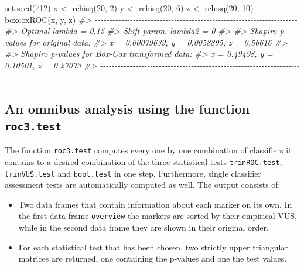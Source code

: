 \documentclass[
]{article}
\newenvironment{Shaded}{\begin{snugshade}}{\end{snugshade}}
\newcommand{\CommentTok}[1]{\textcolor[rgb]{0.56,0.35,0.01}{\textit{#1}}}
\newcommand{\DecValTok}[1]{\textcolor[rgb]{0.00,0.00,0.81}{#1}}
\newcommand{\FunctionTok}[1]{\textcolor[rgb]{0.00,0.00,0.00}{#1}}
\newcommand{\NormalTok}[1]{#1}
\newcommand{\OtherTok}[1]{\textcolor[rgb]{0.56,0.35,0.01}{#1}}
\begin{document}
\begin{Shaded}
\begin{Highlighting}[]
\FunctionTok{set.seed}\NormalTok{(}\DecValTok{712}\NormalTok{)}
\NormalTok{x }\OtherTok{\textless{}{-}} \FunctionTok{rchisq}\NormalTok{(}\DecValTok{20}\NormalTok{, }\DecValTok{2}\NormalTok{)}
\NormalTok{y }\OtherTok{\textless{}{-}} \FunctionTok{rchisq}\NormalTok{(}\DecValTok{20}\NormalTok{, }\DecValTok{6}\NormalTok{)}
\NormalTok{z }\OtherTok{\textless{}{-}} \FunctionTok{rchisq}\NormalTok{(}\DecValTok{20}\NormalTok{, }\DecValTok{10}\NormalTok{)}
\FunctionTok{boxcoxROC}\NormalTok{(x, y, z)}
\CommentTok{\#\textgreater{} {-}{-}{-}{-}{-}{-}{-}{-}{-}{-}{-}{-}{-}{-}{-}{-}{-}{-}{-}{-}{-}{-}{-}{-}{-}{-}{-}{-}{-}{-}{-}{-}{-}{-}{-}{-}{-}{-}{-}{-}{-}{-}{-}{-}{-}{-}{-}{-}{-}{-}{-}{-}{-}{-}{-}{-}{-}{-}{-}{-}{-}{-}{-}{-}{-}{-}{-}{-}{-} }
\CommentTok{\#\textgreater{}  Optimal lambda       = 0.15}
\CommentTok{\#\textgreater{}  Shift param. lambda2 = 0}
\CommentTok{\#\textgreater{} }
\CommentTok{\#\textgreater{}  Shapiro p{-}values for original data: }
\CommentTok{\#\textgreater{}  x = 0.00079639, y = 0.0058895, z = 0.56616}
\CommentTok{\#\textgreater{} }
\CommentTok{\#\textgreater{}  Shapiro p{-}values for Box{-}Cox transformed data: }
\CommentTok{\#\textgreater{}  x = 0.49498, y = 0.10501, z = 0.27073}
\CommentTok{\#\textgreater{} {-}{-}{-}{-}{-}{-}{-}{-}{-}{-}{-}{-}{-}{-}{-}{-}{-}{-}{-}{-}{-}{-}{-}{-}{-}{-}{-}{-}{-}{-}{-}{-}{-}{-}{-}{-}{-}{-}{-}{-}{-}{-}{-}{-}{-}{-}{-}{-}{-}{-}{-}{-}{-}{-}{-}{-}{-}{-}{-}{-}{-}{-}{-}{-}{-}{-}{-}{-}{-}}
\end{Highlighting}
\end{Shaded}

\hypertarget{an-omnibus-analysis-using-the-function-roc3.test}{%
\subsection{\texorpdfstring{An omnibus analysis using the function
\texttt{roc3.test}}{An omnibus analysis using the function roc3.test}}\label{an-omnibus-analysis-using-the-function-roc3.test}}

The function \texttt{roc3.test} computes every one by one combination of
classifiers it contains to a desired combination of the three
statistical tests \texttt{trinROC.test}, \texttt{trinVUS.test} and
\texttt{boot.test} in one step. Furthermore, single classifier
assessment tests are automatically computed as well. The output consists
of:

\begin{itemize}
\item
  Two data frames that contain information about each marker on its own.
  In the first data frame \texttt{overview} the markers are sorted by
  their empirical VUS, while in the second data frame they are shown in
  their original order.
\item
  For each statistical test that has been chosen, two strictly upper
  triangular matrices are returned, one containing the p-values and one
  the test values.
\end{itemize}
\end{document}
